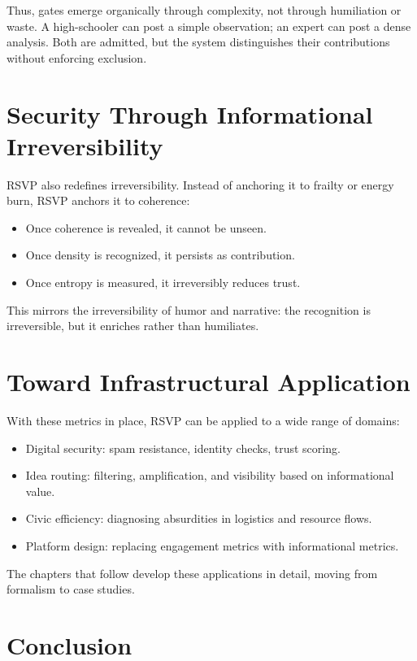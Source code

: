 \documentclass[openany]{book}
\begin{document}
Thus, gates emerge organically through complexity, not through humiliation or waste. A high-schooler can post a simple observation; an expert can post a dense analysis. Both are admitted, but the system distinguishes their contributions without enforcing exclusion.

\section{Security Through Informational Irreversibility}

RSVP also redefines irreversibility. Instead of anchoring it to frailty or energy burn, RSVP anchors it to coherence:

\begin{itemize}
    \item Once coherence is revealed, it cannot be unseen.
    \item Once density is recognized, it persists as contribution.
    \item Once entropy is measured, it irreversibly reduces trust.
\end{itemize}

This mirrors the irreversibility of humor and narrative: the recognition is irreversible, but it enriches rather than humiliates.

\section{Toward Infrastructural Application}

With these metrics in place, RSVP can be applied to a wide range of domains:

\begin{itemize}
    \item Digital security: spam resistance, identity checks, trust scoring.
    \item Idea routing: filtering, amplification, and visibility based on informational value.
    \item Civic efficiency: diagnosing absurdities in logistics and resource flows.
    \item Platform design: replacing engagement metrics with informational metrics.
\end{itemize}

The chapters that follow develop these applications in detail, moving from formalism to case studies.

\section{Conclusion}
\end{document}
